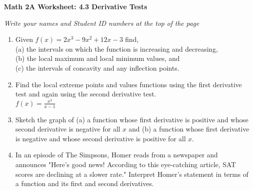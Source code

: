 \documentclass[12pt,fleqn]{article}
\begin{document}
\begin{center}
	\textbf{Math 2A Worksheet: 4.3 Derivative Tests}
\end{center}

\emph{Write your names and Student ID numbers at the top of the page}

\begin{enumerate}
\item Given $f(x)=2x^3-9x^2+12x-3$ 
find,\\
(a) the intervals on which the function is increasing and decreasing,\\
(b) the local maximum and local minimum values, and\\
(c) the intervals of concavity and any inflection points.\vfill

\item Find the local extreme points and values functions using the first derivative test and again using the second derivative test.\\
$f(x)=\displaystyle \frac{x^2}{x-1}$\vfill


\newpage

\item Sketch the graph of (a) a function whose first derivative is positive and whose second derivative is negative for all $x$ and (b) a function whose first derivative is negative and whose second derivative is positive for all $x$.\vfill

\item In an episode of The Simpsons, Homer reads from a newspaper and announces "Here's good news!  According to this eye-catching article, SAT scores are declining at a slower rate."  Interpret Homer's statement in terms of a function and its first and second derivatives.\vfill

\end{enumerate}
\end{document}
